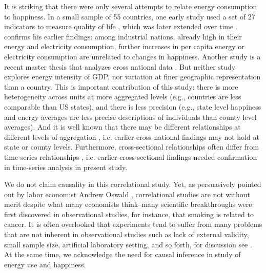 \documentclass[10pt, letterpaper]{article}
\begin{document}
\begin{spacing}{1.5}
It is striking that there were only several attempts to
relate energy consumption to happiness.   %
 In a small sample of 55 countries, one early study used a set of 27 indicators to measure
 quality of life \citep{mazur74}, which was later extended over time
 \citep{mazur11}. \citet{mazur13} confirms his earlier findings: among
 industrial nations, already high in their energy and electricity consumption,
 further increases in per capita energy or electricity consumption are unrelated
 to changes in happiness. 
 Another study is a recent master
 thesis that  analyzes cross national data \citep{winfrey13}. But neither
 study  explores energy intensity of GDP, nor variation at finer geographic
 representation than a country. This is important contribution of this study:
 there is more heterogeneity across units at more aggregated levels (e.g.,
 countries are less comparable than US states), and there is less precision
 (e.g., state level happiness and energy averages are less precise descriptions
 of individuals than county level averages). And it is well known that there
 may be different relationships at different levels of aggregation
 \citep[e.g.,][]{ashkanasy11}, i.e. earlier cross-national findings may not hold
 at state or county levels. Furthermore, cross-sectional relationships often
 differ from time-series relationships \citep{easterlin12}, i.e. earlier
 cross-sectional findings needed confirmation in time-series analysis in present study. 





We do not claim causality in this  correlational study. Yet, as persuasively
pointed out by labor economist Andrew Oswald
\citep[e.g.,][]{blanchflower11,oswald14}, correlational studies are not
without merit despite what many economists %
 think--many scientific breakthroughs were first
discovered in observational studies, for instance,  that smoking is
related to cancer. It is often overlooked that experiments tend to  
suffer from many problems that are not inherent in
observational studies such as lack of external validity, small sample size, 
artificial laboratory setting, and so forth, for discussion see
\citet{pawson97}. %
 At the same time, we acknowledge the need for causal inference in study of
 energy use and happiness.  


\end{spacing}
\end{document}
